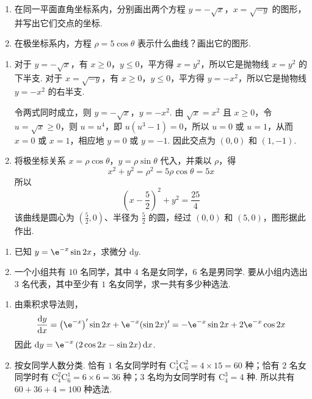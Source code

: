 \begin{problem}
\begin{enumerate}
\item 在同一平面直角坐标系内，分别画出两个方程 \(y = -\sqrt{x}\)，\(x = \sqrt{-y}\) 的图形，并写出它们交点的坐标.
\item 在极坐标系内，方程 \(\rho = 5\cos \theta\) 表示什么曲线？画出它的图形.
\end{enumerate}

\begin{solution}
\begin{enumerate}
\item 对于 \(y=-\sqrt{x}\)，有 \(x\geqslant0\)，\(y\leqslant0\)，平方得 \(x=y^{2}\)，所以它是抛物线 \(x=y^{2}\) 的下半支. 对于 \(x=\sqrt{-y}\)，有 \(x\geqslant0\)，\(y\leqslant0\)，平方得 \(y=-x^{2}\)，所以它是抛物线 \(y=-x^{2}\) 的右半支.

令两式同时成立，则 \(y=-\sqrt{x}\)，\(y=-x^{2}\). 由 \(\sqrt{x}=x^{2}\) 且 \(x\geqslant0\)，令 \(u=\sqrt{x}\geqslant0\)，则 \(u=u^{4}\)，即 \(u(u^{3}-1)=0\)，所以 \(u=0\) 或 \(u=1\)，从而 \(x=0\) 或 \(x=1\)，相应地 \(y=0\) 或 \(y=-1\). 因此交点为 \((0,0)\) 和 \((1,-1)\).
\item 将极坐标关系 \(x=\rho\cos\theta\)，\(y=\rho\sin\theta\) 代入，并乘以 \(\rho\)，得
\[
x^{2}+y^{2}=\rho^{2}=5\rho\cos\theta=5x
\]
所以
\[
\left(x-\frac{5}{2}\right)^{2}+y^{2}=\frac{25}{4}
\]
该曲线是圆心为 \(\left(\frac{5}{2},0\right)\)、半径为 \(\frac{5}{2}\) 的圆，经过 \((0,0)\) 和 \((5,0)\)，图形据此作出.
\end{enumerate}
\end{solution}
\end{problem}

\begin{problem}
\begin{enumerate}
\item 已知 \(y = \e^{-x}\sin 2x\)，求微分 \(\mathrm{d}y\).
\item 一个小组共有 \(10\) 名同学，其中 \(4\) 名是女同学，\(6\) 名是男同学. 要从小组内选出 \(3\) 名代表，其中至少有 \(1\) 名女同学，求一共有多少种选法.
\end{enumerate}

\begin{solution}
\begin{enumerate}
\item 由乘积求导法则，
\[
\frac{\mathrm{d}y}{\mathrm{d}x}=\left(\e^{-x}\right)'\sin 2x+\e^{-x}(\sin 2x)'=-\e^{-x}\sin 2x+2\e^{-x}\cos 2x
\]
因此 \(\mathrm{d}y=\e^{-x}\left(2\cos 2x-\sin 2x\right)\mathrm{d}x\).
\item 按女同学人数分类. 恰有 \(1\) 名女同学时有 \(\mathrm C_{4}^{1}\mathrm C_{6}^{2}=4\times15=60\) 种；恰有 \(2\) 名女同学时有 \(\mathrm C_{4}^{2}\mathrm C_{6}^{1}=6\times6=36\) 种；\(3\) 名均为女同学时有 \(\mathrm C_{4}^{3}=4\) 种. 所以共有 \(60+36+4=100\) 种选法.
\end{enumerate}
\end{solution}
\end{problem}

